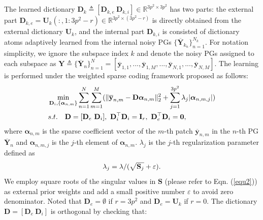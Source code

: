 \documentclass[10pt,twocolumn,letterpaper]{article}
\begin{document}
The learned dictionary $\mathbf{D}_{k}\triangleq[\mathbf{D}_{k,e}\ \mathbf{D}_{k,i}]\in \mathbb{R}^{3p^2\times 3p^2}$ has two parts: the external part $\mathbf{D}_{k,e}=\mathbf{U}_{k}(:,1:3p^2-r)\in\mathbb{R}^{3p^2\times (3p^2-r)}$ is directly obtained from the external dictionary $\mathbf{U}_{k}$, and the internal part $\mathbf{D}_{k,i}$ is consisted of dictionary atoms adaptively learned from the internal noisy PGs $\{\mathbf{\overline{Y}}_{k_{n}}\}_{n=1}^{N_{k}}$. For notation simplicity, we ignore the subspace index $k$ and denote the noisy PGs assigned to each subspace as $\mathbf{Y}\triangleq\{\mathbf{\overline{Y}}_{n}\}_{n=1}^{N} = [\mathbf{\overline{y}}_{1,1},...,\mathbf{\overline{y}}_{1,M},...,\mathbf{\overline{y}}_{N,1},...,\mathbf{\overline{y}}_{N,M}]$. The learning is performed under the weighted sparse coding framework proposed as follows:
\vspace{-2mm}
\begin{equation}\label{equ4}\vspace{-3mm}
\begin{split}
&\min_{\mathbf{D}_{i},\{\bm{\alpha}_{n,m}\}}
\sum_{n=1}^{N}\sum_{m=1}^{M}(\|\mathbf{\overline{y}}_{n,m}-\mathbf{D}\bm{\alpha}_{n,m}\|_{2}^{2}+\sum_{j=1}^{3p^{2}}\lambda_{j}|\bm{\alpha}_{n,m,j}|)
\\
&
s.t.
\quad
\mathbf{D}=[\mathbf{D}_{e}\ \mathbf{D}_{i}],\ \mathbf{D}_{i}^{\top}\mathbf{D}_{i} = \mathbf{I}_{r},\ \mathbf{D}_{e}^{\top}\mathbf{D}_{i} = \mathbf{0},
\end{split}
\end{equation}
where $\bm{\alpha}_{n,m}$ is the sparse coefficient vector of the $m$-th patch $\mathbf{\overline{y}}_{n,m}$ in the $n$-th PG $\mathbf{\overline{Y}}_{n}$ and $\bm{\alpha}_{n,m,j}$ is the $j$-th element of $\bm{\alpha}_{n,m}$. $\lambda_{j}$ is the $j$-th regularization parameter defined as
\vspace{-1mm}
\begin{equation}\label{equ5}\vspace{-1mm}
\lambda_{j} = \lambda/(\sqrt{\mathbf{S}_{j}}+\varepsilon).
\end{equation}
We employ square roots of the singular values in $\mathbf{S}$ (please refer to Eqn. (\ref{equ2})) as external prior weights and add a small positive number $\varepsilon$ to avoid zero denominator. Noted that $\mathbf{D}_{e}=\emptyset$ if $r=3p^{2}$ and $\mathbf{D}_{e}=\mathbf{U}_{k}$ if $r=0$. The dictionary $\mathbf{D} = [\mathbf{D}_{e}\ \mathbf{D}_{i}]$ is orthogonal by checking that:
\vspace{-2mm}
\end{document}
